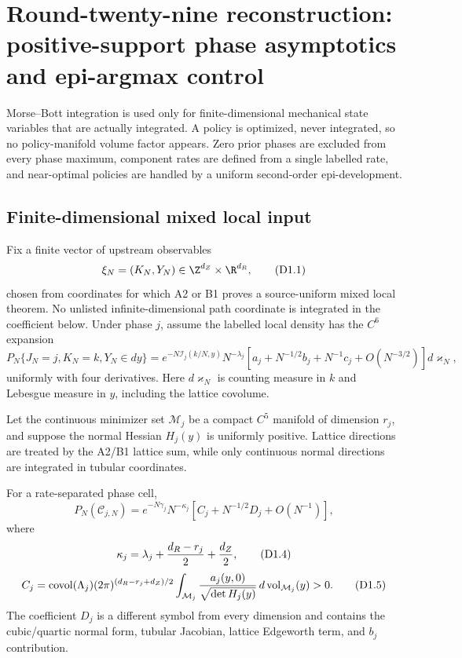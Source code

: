 \section{Round-twenty-nine reconstruction: positive-support phase asymptotics and epi-argmax control}
\label{sec:r29-d1}

Morse--Bott integration is used only for finite-dimensional mechanical state
variables that are actually integrated.  A policy is optimized, never
integrated, so no policy-manifold volume factor appears.  Zero prior phases
are excluded from every phase maximum, component rates are defined from a
single labelled rate, and near-optimal policies are handled by a uniform
second-order epi-development.

\subsection{Finite-dimensional mixed local input}

Fix a finite vector of upstream observables
\[
 \xi_N=(K_N,Y_N)\in\Z^{d_Z}\times\R^{d_R},                \tag{D1.1}
\]
chosen from coordinates for which A2 or B1 proves a source-uniform mixed local
theorem.  No unlisted infinite-dimensional path coordinate is integrated in
the coefficient below.  Under phase $j$, assume the labelled local density
has the $C^6$ expansion
\[
 P_N\{J_N=j,K_N=k,Y_N\in dy\}
 =e^{-N\mathcal I_j(k/N,y)}N^{-\lambda_j}
 [a_j+N^{-1/2}b_j+N^{-1}c_j+O(N^{-3/2})]d\varkappa_N,    \tag{D1.2}
\]
uniformly with four derivatives.  Here $d\varkappa_N$ is counting measure in
$k$ and Lebesgue measure in $y$, including the lattice covolume.

Let the continuous minimizer set $\mathcal M_j$ be a compact $C^5$ manifold
of dimension $r_j$, and suppose the normal Hessian $H_j(y)$ is uniformly
positive.  Lattice directions are treated by the A2/B1 lattice sum, while only
continuous normal directions are integrated in tubular coordinates.

\begin{theorem}
\label{thm:r29-d1-weight}
For a rate-separated phase cell,
\[
 P_N(\mathcal C_{j,N})
 =e^{-N\gamma_j}N^{-\kappa_j}
 [C_j+N^{-1/2}D_j+O(N^{-1})],                             \tag{D1.3}
\]
where
\[
 \kappa_j=\lambda_j+{d_R-r_j\over2}+{d_Z\over2},          \tag{D1.4}
\]
\[
 C_j=\operatorname{covol}(\Lambda_j)(2\pi)^{(d_R-r_j+d_Z)/2}
 \int_{\mathcal M_j}{a_j(y,0)\over\sqrt{\det H_j(y)}}
 \,d\operatorname{vol}_{\mathcal M_j}(y)>0.              \tag{D1.5}
\]
The coefficient $D_j$ is a different symbol from every dimension and contains
the cubic/quartic normal form, tubular Jacobian, lattice Edgeworth term, and
$b_j$ contribution.
\end{theorem}

